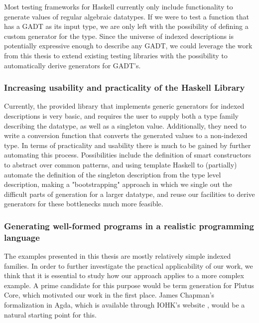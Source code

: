 \documentclass[a4paper,msc,twosized=semi]{uustthesis}
\begin{document}
  Most testing frameworks for Haskell currently only include functionality to generate 
  values of regular algebraic datatypes. If we were to test a function that has a GADT 
  as its input type, we are only left with the possibility of defining a custom 
  generator for the type. Since the universe of indexed descriptions is potentially 
  expressive enough to describe any GADT, we could leverage the work from this thesis 
  to extend existing testing libraries with the possibility to automatically derive 
  generators for GADT's. 

\subsubsection{Increasing usability and practicality of the Haskell Library}

  Currently, the provided library that implements generic generators for indexed 
  descriptions is very basic, and requires the user to supply both a type family 
  describing the datatype, as well as a singleton value. Additionally, they need to 
  write a conversion function that converts the generated values to a non-indexed 
  type. In terms of practicality and usability there is much to be gained by further 
  automating this process. Possibilities include the definition of smart constructors 
  to abstract over common patterns, and using template Haskell \cite
  {sheard2002template} to (partially) automate the definition of the singleton 
  description from the type level description, making a "bootstrapping" approach in which 
  we single out the difficult parts of generation for a larger datatype, and reuse 
  our facilities to derive generators for these bottlenecks much more feasible. 

\subsubsection{Generating well-formed programs in a realistic programming language}

  The examples presented in this thesis are mostly relatively simple indexed families. 
  In order to further investigate the practical applicability of our work, we think 
  that it is essential to study how our approach applies to a more complex example. 
  A prime candidate for this purpose would be term generation for Plutus Core, which 
  motivated our work in the first place. James Chapman's formalization in Agda, which 
  is available through IOHK's website \cite{systemfagda}, would be a natural starting 
  point for this. 


\backmatter
\listoffigures



\end{document}
